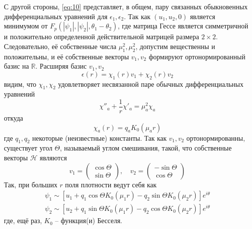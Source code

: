 С другой стороны, \eqref{eq:10} представляет, в общем, пару связанных 
обыкновенных дифференциальных уравнений для \( \epsilon_1, \epsilon_2 \). Так 
как \( (u_1, u_2, 0 ) \) является минимумом от 
\( F_p(|\psi_1|, |\psi_2|, \theta_1 - \theta_2) \), где матрица Гессе является  
симметричной и положительно определенной действительной матрицей размера 
\( 2\times2 \). Следовательно, её собственные числа \( \mu_1^2, \mu_2^2\), 
допустим вещественны и положительны, и её собственные векторы \( v_1, v_2 \) 
формируют ортонормированный базис на \( \mathbb{R} \). Расширяя базис 
\( v_1, v_2 \)
\begin{equation}
    \epsilon(r) = \chi_1(r) v_1 + \chi_2(r) v_2
    \label{eq:17}
\end{equation}
видим, что \( \chi_1, \chi_2 \) удовлетворяет несвязанной паре обычных 
дифференциальных уравнений
\begin{equation}
    \chi''_a + \frac{1}{r}\chi'_a = \mu_a^2 \chi_a
    \label{eq:18}
\end{equation}
откуда
\begin{equation}
    \chi_a(r) = q_a K_0(\mu_a r)
    \label{eq:19}
\end{equation}
где \( q_1, q_2 \) некоторые (неизвестные) константы. Так как \( v_1, v_2 \) 
ортонормированны, существует угол \( \Theta \), называемый углом смешивания, 
такой, что собственные векторы \( \mathcal{H} \) являются
\begin{equation}
    v_1 = \left( \begin{array}{c}
        \cos\Theta \\
        \sin\Theta
    \end{array} \right), \quad
    v_2 = \left( \begin{array}{c}
        -\sin\Theta \\
        \cos\Theta
    \end{array} \right)
    \label{eq:20}
\end{equation}
Так, при больших \( r \) поля плотности ведут себя как 
\begin{gather}
    \psi_1 \sim \left[ u_1 + q_1\cos\Theta K_0(\mu_1 r) - 
        q_2\sin\Theta K_0(\mu_2 r) \right]e^{i\theta} \nonumber \\
    \psi_2 \sim \left[ u_2 + q_1\sin\Theta K_0(\mu_1 r) - 
        q_2\cos\Theta K_0(\mu_2 r) \right]e^{i\theta}
    \label{eq:21}
\end{gather}
где, ещё раз, \( K_0 \) -- функция(и) Бесселя.

